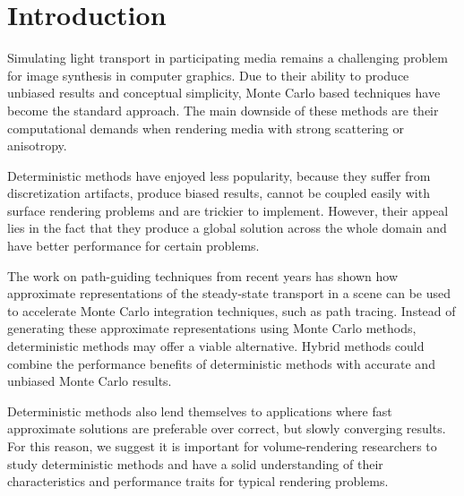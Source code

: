 
\section{Introduction}
\vspace{0.1in}

Simulating light transport in participating media remains a challenging problem for image synthesis in computer graphics. Due to their ability to produce unbiased results and conceptual simplicity, Monte Carlo based techniques have become the standard approach. The main downside of these methods are their computational demands when rendering media with strong scattering or anisotropy.

Deterministic methods have enjoyed less popularity, because they suffer from discretization artifacts, produce biased results, cannot be coupled easily with surface rendering problems and are trickier to implement. However, their appeal lies in the fact that they produce a global solution across the whole domain and have better performance for certain problems.

The work on path-guiding techniques from recent years has shown how approximate representations of the steady-state transport in a scene can be used to accelerate Monte Carlo integration techniques, such as path tracing. Instead of generating these approximate representations using Monte Carlo methods, deterministic methods may offer a viable alternative. Hybrid methods could combine the performance benefits of deterministic methods with accurate and unbiased Monte Carlo results.

Deterministic methods also lend themselves to applications where fast approximate solutions are preferable over correct, but slowly converging results. For this reason, we suggest it is important for volume-rendering researchers to study deterministic methods and have a solid understanding of their characteristics and performance traits for typical rendering problems.

